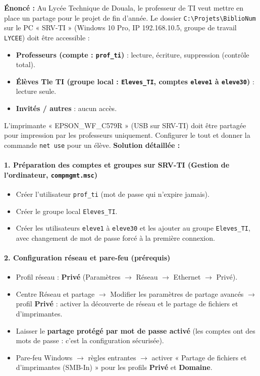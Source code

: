 \documentclass[11pt]{article}
\begin{document}
\begin{exoresolu}
\textbf{Énoncé :} Au Lycée Technique de Douala, le professeur de TI veut mettre en place un partage pour le projet de fin d'année. Le dossier \texttt{C:\textbackslash Projets\textbackslash BiblioNum} sur le PC « SRV-TI » (Windows 10 Pro, IP 192.168.10.5, groupe de travail \texttt{LYCEE}) doit être accessible :
\begin{itemize}
    \item \textbf{Professeurs (compte : \texttt{prof\_ti})} : lecture, écriture, suppression (contrôle total).
    \item \textbf{Élèves Tle TI (groupe local : \texttt{Eleves\_TI}, comptes \texttt{eleve1} à \texttt{eleve30})} : lecture seule.
    \item \textbf{Invités / autres} : aucun accès.
\end{itemize}
L'imprimante « EPSON\_WF\_C579R » (USB sur SRV-TI) doit être partagée pour impression par les professeurs uniquement. Configurer le tout et donner la commande \texttt{net use} pour un élève.
\tcblower
\textbf{Solution détaillée :}

\paragraph{1. Préparation des comptes et groupes sur SRV-TI (Gestion de l'ordinateur, \texttt{compmgmt.msc})}
\begin{itemize}
    \item Créer l'utilisateur \texttt{prof\_ti} (mot de passe qui n'expire jamais).
    \item Créer le groupe local \texttt{Eleves\_TI}.
    \item Créer les utilisateurs \texttt{eleve1} à \texttt{eleve30} et les ajouter au groupe \texttt{Eleves\_TI}, avec changement de mot de passe forcé à la première connexion.
\end{itemize}

\paragraph{2. Configuration réseau et pare-feu (prérequis)}
\begin{itemize}
    \item Profil réseau : \textbf{Privé} (Paramètres $\rightarrow$ Réseau $\rightarrow$ Ethernet $\rightarrow$ Privé).
    \item Centre Réseau et partage $\rightarrow$ Modifier les paramètres de partage avancés $\rightarrow$ profil \textbf{Privé} : activer la découverte de réseau et le partage de fichiers et d'imprimantes.
    \item Laisser le \textbf{partage protégé par mot de passe activé} (les comptes ont des mots de passe : c'est la configuration sécurisée).
    \item Pare-feu Windows $\rightarrow$ règles entrantes $\rightarrow$ activer « Partage de fichiers et d'imprimantes (SMB-In) » pour les profils \textbf{Privé} et \textbf{Domaine}.
\end{itemize}


\end{exoresolu}
\end{document}
